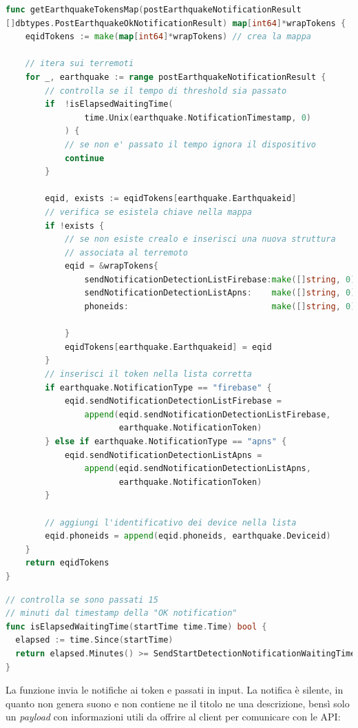 \documentclass[main.tex]{subfiles}
\begin{document}
\begin{lstlisting}[language=go]
func getEarthquakeTokensMap(postEarthquakeNotificationResult 
[]dbtypes.PostEarthquakeOkNotificationResult) map[int64]*wrapTokens {
    eqidTokens := make(map[int64]*wrapTokens) // crea la mappa

    // itera sui terremoti
    for _, earthquake := range postEarthquakeNotificationResult {
        // controlla se il tempo di threshold sia passato
        if  !isElapsedWaitingTime(
                time.Unix(earthquake.NotificationTimestamp, 0)
            ) {
            // se non e' passato il tempo ignora il dispositivo
            continue
        }
        
        eqid, exists := eqidTokens[earthquake.Earthquakeid]
        // verifica se esistela chiave nella mappa
        if !exists {
            // se non esiste crealo e inserisci una nuova struttura 
            // associata al terremoto
            eqid = &wrapTokens{
                sendNotificationDetectionListFirebase:make([]string, 0),
                sendNotificationDetectionListApns:    make([]string, 0),
                phoneids:                             make([]string, 0),

            }
            eqidTokens[earthquake.Earthquakeid] = eqid
        }
        // inserisci il token nella lista corretta
        if earthquake.NotificationType == "firebase" {
            eqid.sendNotificationDetectionListFirebase = 
                append(eqid.sendNotificationDetectionListFirebase, 
                       earthquake.NotificationToken)
        } else if earthquake.NotificationType == "apns" {
            eqid.sendNotificationDetectionListApns = 
                append(eqid.sendNotificationDetectionListApns,     
                       earthquake.NotificationToken)
        }
        
        // aggiungi l'identificativo dei device nella lista
        eqid.phoneids = append(eqid.phoneids, earthquake.Deviceid)
    }
    return eqidTokens
}
\end{lstlisting}
\begin{lstlisting}[language=go]
// controlla se sono passati 15 
// minuti dal timestamp della "OK notification"
func isElapsedWaitingTime(startTime time.Time) bool {
  elapsed := time.Since(startTime)
  return elapsed.Minutes() >= SendStartDetectionNotificationWaitingTime
}
\end{lstlisting}
La funzione  invia le notifiche ai token   e  passati in input. La notifica è silente, in quanto non genera suono e non contiene ne il titolo ne una descrizione, bensì solo un \emph{payload} con informazioni utili da offrire al client per comunicare con le API:
\end{document}
